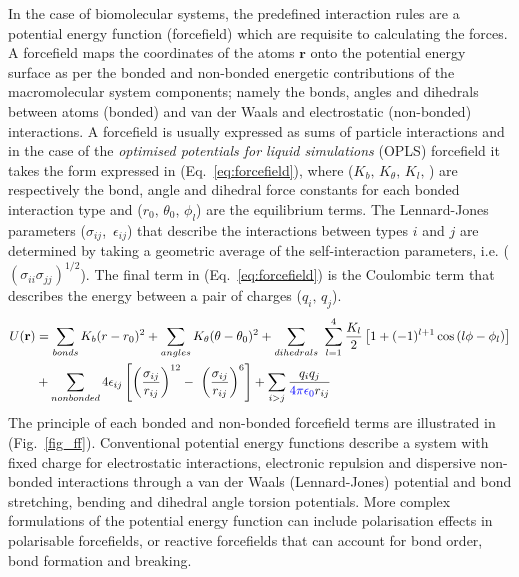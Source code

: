 In the case of biomolecular systems, the predefined interaction rules are a potential energy function (forcefield) which are requisite to calculating the forces. A forcefield maps the coordinates of the atoms $\mathbf{r}$ onto the potential energy surface as per the bonded and non-bonded energetic contributions of the macromolecular system components; namely the bonds, angles and dihedrals between atoms (bonded) and van der Waals and electrostatic (non-bonded) interactions.\cite{de2016role} A forcefield is usually expressed as sums of particle interactions and in the case of the \textit{optimised potentials for liquid simulations} (OPLS) forcefield \cite{jorgensen1988opls, jorgensen1996development} it takes the form expressed in (Eq.~\ref{eq:forcefield}), where ($K_b,\,K_{\theta},\,K_l,\,$) are respectively the bond, angle and dihedral force constants for each bonded interaction type and ($r_0,\, \theta_0,\, \phi_l$) are the equilibrium terms. The Lennard-Jones parameters ($\sigma_{ij}$,\, $\epsilon_{ij}$) that describe the interactions between types $i$ and $j$ are determined by taking a geometric average of the self-interaction parameters, i.e. ($(\sigma_{ii}\sigma_{jj})^{1/2}$). The final term in (Eq.~\ref{eq:forcefield}) is the Coulombic term that describes the energy between a pair of charges ($q_i,\,q_j$). 
%
\begin{equation} \label{eq:forcefield}
\begin{split}
U(\mathbf{r}) &= \sum_{bonds} K_b(r - r_0)^2 + \sum_{angles} K_{\theta}(\theta - \theta_0)^2 + \sum_{dihedrals} \, \, \sum_{l=1}^{4} \frac{K_{l}}{2}\left[1+(-1)^{l+1}\cos{(l\phi -\phi_{l})}\right] \\
&+ \sum_{nonbonded} 4\epsilon_{ij} \left[ \left( \frac{\sigma_{ij}}{r_{ij}}\right)^{12}-\,\,\left( \frac{\sigma_{ij}}{r_{ij}}\right)^{6} \right] + \sum_{i > j}  \frac{q_{i}q_{j}}{\textcolor{blue}{4 \pi \epsilon_{0}}r_{ij}}
\end{split}
\end{equation}
%
The principle of each bonded and non-bonded forcefield terms are illustrated in (Fig.~\ref{fig_ff}). Conventional potential energy functions describe a system with fixed charge for electrostatic interactions, electronic repulsion and dispersive non-bonded interactions through a van der Waals (Lennard-Jones) potential and bond stretching, bending and dihedral angle torsion potentials. More complex formulations of the potential energy function can include polarisation effects in polarisable forcefields,\cite{ponder2010current} or reactive forcefields that can account for bond order, bond formation and breaking.\cite{van2001reaxff}
